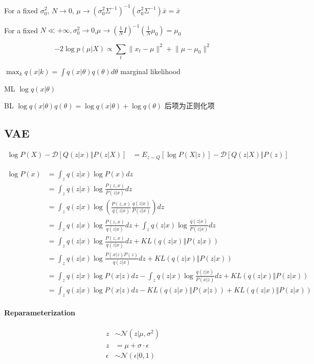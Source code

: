 For a fixed $\sigma_0^2$, $N\rightarrow 0$, $\mu\rightarrow(\sigma_0^2\Sigma^{-1})^{-1}(\sigma_0^2\Sigma^{-1})\bar{x}=\bar{x}$

For a fixed $N\ll +\infty, \sigma_0^2\rightarrow 0$,$\mu\rightarrow (\frac{1}{N}I)^{-1}(\frac{1}{N}\mu_0)=\mu_0$

\begin{equation}
	-2\log p(\mu|X) \propto \sum_t \lVert x_t-\mu \rVert^2+\lVert\mu-\mu_0\rVert^2
\end{equation}

$\max_k q(x|k)=\int q(x|\theta)q(\theta)d\theta$ marginal likelihood

ML $\log q(x|\theta)$

BL $\log q(x|\theta)q(\theta)=\log q(x|\theta) + \log q(\theta)$ 后项为正则化项

\subsection{VAE}

\begin{align}
	\log P(X) - \mathcal{D}[Q(z|x)\Vert P(z|X)] &= E_{z\sim Q}[\log P(X|z)] - \mathcal{D}[Q(z|X)\Vert P(z)]
\end{align}

\begin{align*}
	\log P(x) &= \int_z q(z|x)\log P(x)dz\\
	&=\int_z q(z|x)\log\frac{P(z,x)}{P(z|x)}dz\\
	&=\int_z q(z|x)\log\left(\frac{P(z,x)}{q(z|x)}\frac{q(z|x)}{P(z|x)}\right)dz\\
	&=\int_z q(z|x)\log\frac{P(z,x)}{q(z|x)}dz + \int_z q(z|x)\log\frac{q(z|x)}{P(z|x)}dz\\
	&=\int_z q(z|x)\log\frac{P(z,x)}{q(z|x)}dz + KL(q(z|x)\Vert P(z|x))\\
	&=\int_z q(z|x)\log\frac{P(x|z)P(z)}{q(z|x)}dz + KL(q(z|x)\Vert P(z|x))\\
	&=\int_z q(z|x)\log P(x|z)dz - \int_z q(z|x)\log\frac{q(z|x)}{P(x|z)}dz + KL(q(z|x)\Vert P(z|x))\\
	&=\int_z q(z|x)\log P(x|z)dz - KL(q(z|x)\Vert P(x|z)) + KL(q(z|x)\Vert P(z|x))
\end{align*}

\paragraph{Reparameterization}

\begin{align}
	z&\sim \mathcal{N}(z|\mu,\sigma^2)\\
	z&=\mu+\sigma\cdot\epsilon\\
	\epsilon&\sim\mathcal{N}(\epsilon|0,1)
\end{align}

